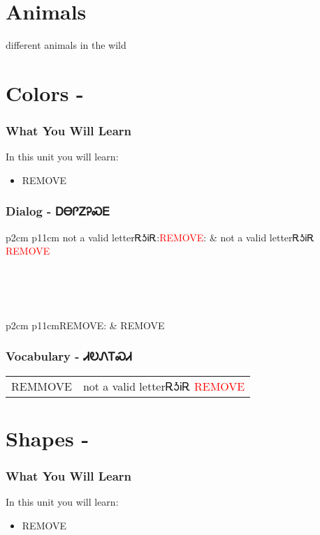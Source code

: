 \chapter{Animals}
different animals in the wild\\
\index{}
\chapter{Colors - }
\subsection{What You Will Learn}
In this unit you will learn:
\begin{itemize}
\item REMOVE
\end{itemize}\newpage

\newpage\subsection{Dialog - ᎠᎾᎵᏃᎮᏍᎬ}
\begin{tabular}{p{2cm} p{11cm}}
not a valid letterᎡᎼᎥᎡ:\newline \textcolor{red}{REMOVE}: & not a valid letterᎡᎼᎥᎡ 
\newline\textcolor{red}{REMOVE}\\
\end{tabular}
\\
\\
\\
\noindent\begin{tabular}{p{2cm} p{11cm}}REMOVE: & REMOVE\\
\end{tabular}
\vfill\newpage\subsection{Vocabulary - ᏗᎧᏁᎢᏍᏗ 
}
\begin{minipage}{\linewidth}
\begin{tabular}{p{3cm} p{11cm}}
REMMOVE & not a valid letterᎡᎼᎥᎡ 
 \newline \textcolor{red}{REMOVE}\\
\end{tabular}
\end{minipage}

\index{}
\chapter{Shapes - }
\subsection{What You Will Learn}
In this unit you will learn:
\begin{itemize}
\item REMOVE
\end{itemize}\newpage

